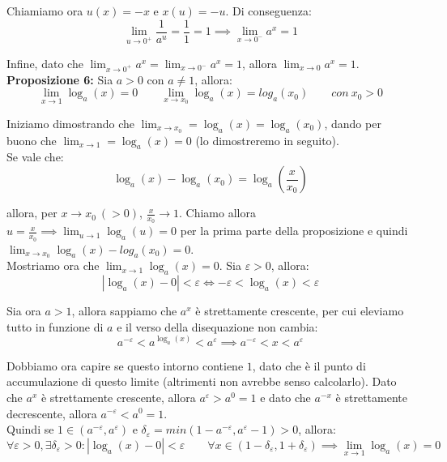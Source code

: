 \documentclass{article}
\begin{document}
\noindent Chiamiamo ora $u(x) = -x$ e $x(u) = -u$. Di conseguenza:
\begin{equation*}
    \lim_{u \to 0^+} \frac{1}{a^u} = \frac{1}{1} = 1 \implies \lim_{x \to 0^-} a^x = 1
\end{equation*}

\noindent Infine, dato che $\lim_{x \to 0^+} a^x = \lim_{x \to 0^-} a^x = 1$, allora $\lim_{x \to 0} a^x = 1$.\\

\noindent\textbf{Proposizione 6:} Sia $a > 0$ con $a \neq 1$, allora:
\begin{equation*}
    \lim_{x \to 1} \log_a(x) = 0 \qquad \lim_{x \to x_0} \log_a(x) = log_a(x_0) \qquad con \ x_0 > 0
\end{equation*}

\noindent Iniziamo dimostrando che $\lim_{x \to x_0} = \log_a(x) = \log_a(x_0)$, dando per buono che $\lim_{x \to 1} = \log_a(x) = 0$ (lo dimostreremo in seguito).\\
Se vale che:
\begin{equation*}
    \log_a(x) - \log_a(x_0) = \log_a\left(\frac{x}{x_0}\right)
\end{equation*}

\noindent allora, per $x \to x_0 \ (> 0)$, $\frac{x}{x_0} \to 1$. Chiamo allora $u = \frac{x}{x_0} \implies \lim_{u \to 1} \log_a(u) = 0$ per la prima parte della proposizione e quindi $\lim_{x \to x_0} \log_a(x) - log_a(x_0) = 0$.\\

\noindent Mostriamo ora che $\lim_{x \to 1} \log_a(x) = 0$. Sia $\varepsilon > 0$, allora:
\begin{equation*}
    |\log_a(x) - 0| < \varepsilon \iff -\varepsilon < \log_a(x) < \varepsilon
\end{equation*}

\noindent Sia ora $a > 1$, allora sappiamo che $a^x$ è strettamente crescente, per cui eleviamo tutto in funzione di $a$ e il verso della disequazione non cambia:
\begin{equation*}
    a^{-\varepsilon} < a^{\log_a(x)} < a^\varepsilon \implies a^{-\varepsilon} < x < a^\varepsilon
\end{equation*}

\noindent Dobbiamo ora capire se questo intorno contiene $1$, dato che è il punto di accumulazione di questo limite (altrimenti non avrebbe senso calcolarlo). Dato che $a^x$ è strettamente crescente, allora $a^\varepsilon > a^0 = 1$ e dato che $a^{-x}$ è strettamente decrescente, allora $a^{-\varepsilon} < a^0 = 1$. \\
Quindi se $1 \in (a^{-\varepsilon}, a^\varepsilon)$ e $\delta_\varepsilon = min(1 - a^{-\varepsilon}, a^\varepsilon - 1) > 0$, allora:
\begin{equation*}
    \forall \varepsilon > 0, \exists \delta_\varepsilon > 0 : |\log_a(x) - 0| < \varepsilon \qquad \forall x \in (1 - \delta_\varepsilon, 1 + \delta_\varepsilon) \implies \lim_{x \to 1} \log_a(x) = 0
\end{equation*}
\end{document}
